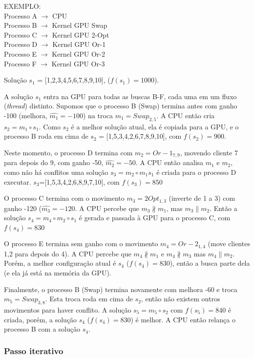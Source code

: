 EXEMPLO:\\
 Processo A $\rightarrow$ CPU\\
 Processo B $\rightarrow$ Kernel GPU Swap\\
 Processo C $\rightarrow$ Kernel GPU 2-Opt\\
 Processo D $\rightarrow$ Kernel GPU Or-1\\
 Processo E $\rightarrow$ Kernel GPU Or-2\\
 Processo F $\rightarrow$ Kernel GPU Or-3

Solução $s_1$ = [1,2,3,4,5,6,7,8,9,10], ($f(s_1) = 1000$).

A solução $s_1$ entra na GPU para todas as buscas B-F, cada uma em um fluxo (\emph{thread}) distinto.
Supomos que o processo B (Swap) termina antes com ganho -100 (melhora, $\widehat{m_1} = -100$) na troca $m_1 = Swap_{2,5}$.
A CPU então cria $s_2 = m_1 \circ s_1$.
Como $s_2$ é a melhor solução atual, ela é copiada para a GPU, e o processo B roda em cima de $s_2$ = [1,5,3,4,2,6,7,8,9,10], com $f(s_2) = 900$.

Neste momento, o processo D termina com $m_2 = Or-1_{7,9}$, movendo cliente 7 para depois do 9, com ganho -50, $\widehat{m_2} = -50$.
A CPU então analisa $m_1$ e $m_2$, como não há conflitos uma solução $s_3 = m_2 \circ m_1 s_1$ é criada para o processo D executar. $s_3$=[1,5,3,4,2,6,8,9,7,10], com $f(s_3) = 850$

O processo C termina com o movimento $m_3=2Opt_{1,3}$ (inverte de 1 a 3) com ganho -120 ($\widehat{m_3} = -120$.
A CPU percebe que $m_3 \nparallel m_1$, mas $m_3 \parallel m_2$.
Então a solução $s_4= m_4 \circ m_2 \circ s_1$ é gerada e passada à GPU para o processo C, com $f(s_4) = 830$

O processo E termina sem ganho com o movimento $m_4 = Or-2_{1,4}$ (move clientes 1,2 para depois do 4).
A CPU percebe que $m_4 \nparallel m_1$ e $m_4 \nparallel m_3$ mas $m_4 \parallel m_2$.
Porém, a melhor configuração atual é $s_4$ ($f(s_4)=830$), então a busca parte dela (e ela já está na memória da GPU).

Finalmente, o processo B (Swap) termina novamente com melhora -60 e troca $m_5=Swap_{3,8}$.
Esta troca roda em cima de $s_2$, então não existem outros movimentos para haver conflito.
A solução $s_5 = m_5 \circ s_2$ com $f(s_5) = 840$ é criada, porém, a solução $s_4$ ($f(s_4) = 830$) é melhor.
A CPU então relança o processo B com a solução $s_4$.

\subsubsection{Passo iterativo}

